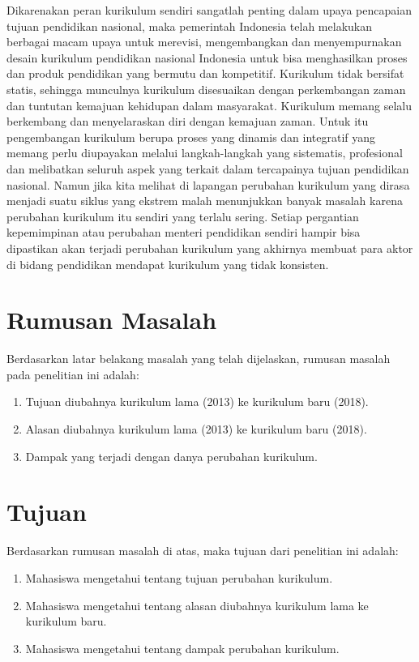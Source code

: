 Dikarenakan peran kurikulum sendiri sangatlah penting dalam upaya pencapaian tujuan pendidikan nasional, maka pemerintah Indonesia telah melakukan berbagai macam upaya untuk merevisi, mengembangkan dan menyempurnakan desain kurikulum pendidikan nasional Indonesia untuk bisa menghasilkan proses dan produk pendidikan yang bermutu dan kompetitif. Kurikulum tidak bersifat statis, sehingga munculnya kurikulum disesuaikan dengan perkembangan zaman dan tuntutan kemajuan kehidupan dalam masyarakat. Kurikulum memang selalu berkembang dan menyelaraskan diri dengan kemajuan zaman. Untuk itu  pengembangan kurikulum berupa proses yang dinamis dan integratif yang memang perlu diupayakan melalui langkah-langkah yang sistematis, profesional dan melibatkan seluruh aspek yang terkait dalam tercapainya tujuan pendidikan nasional. Namun jika kita melihat di lapangan perubahan kurikulum yang dirasa menjadi suatu siklus yang ekstrem malah menunjukkan banyak masalah karena perubahan kurikulum itu sendiri yang terlalu sering. Setiap pergantian kepemimpinan atau perubahan menteri pendidikan sendiri hampir bisa dipastikan akan terjadi perubahan kurikulum yang akhirnya membuat para aktor di bidang pendidikan mendapat kurikulum yang tidak konsisten. 



\section{Rumusan Masalah}
\label{sec:rumusan masalah}

Berdasarkan latar belakang masalah yang telah dijelaskan, rumusan masalah pada penelitian ini adalah:
\begin{enumerate}
\item Tujuan diubahnya kurikulum lama (2013) ke kurikulum baru (2018).
\item Alasan diubahnya kurikulum lama (2013) ke kurikulum baru (2018).
\item Dampak yang terjadi dengan danya perubahan kurikulum. 

\end{enumerate}

\section{Tujuan}
\label{sec:tujuan}
Berdasarkan rumusan masalah di atas, maka tujuan dari penelitian ini adalah: 
\begin{enumerate}
\item Mahasiswa mengetahui tentang tujuan perubahan kurikulum.
\item Mahasiswa mengetahui tentang alasan diubahnya kurikulum lama ke kurikulum baru.
\item Mahasiswa mengetahui tentang dampak perubahan kurikulum.
\end{enumerate}

